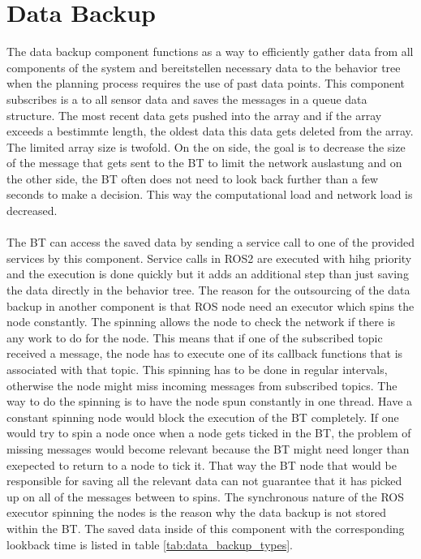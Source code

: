 \section{Data Backup}
The data backup component functions as a way to efficiently gather data from all components of the system and bereitstellen necessary data to the behavior tree when the planning process requires the use of past data points.  This component subscribes is a to all sensor data and saves the messages in a queue data structure. The most recent data gets pushed into the array and if the array exceeds a bestimmte length, the oldest data this data gets deleted from the array. The limited array size is twofold. On the on side, the goal is to decrease the size of the message that gets sent to the BT to limit the network auslastung and on the other side, the BT often does not need to look back further than a few seconds to make a decision. This way the computational load and network load is decreased.
\paragraph*{}

The BT can access the saved data by sending a service call to one of the provided services by this component. Service calls in ROS2 are executed with hihg priority and the execution is done quickly but it adds an additional step than just saving the data directly in the behavior tree. The reason for the outsourcing of the data backup in another component is that ROS node need an executor which spins the node constantly. The spinning allows the node to check the network if there is any work to do for the node. This means that if one of the subscribed topic received a message, the node has to execute one of its callback functions that is associated with that topic. This spinning has to be done in regular intervals, otherwise the node might miss incoming messages from subscribed topics. The way to do the spinning is to have the node spun constantly in one thread. Have a constant spinning node would block the execution of the BT completely. If one would try to spin a node once when a node gets ticked in the BT, the problem of missing messages would become relevant because the BT might need longer than exepected to return to a node to tick it. That way the BT node that would be responsible for saving all the relevant data can not guarantee that it has picked up on all of the messages between to spins. The synchronous nature of the ROS executor spinning the nodes is the reason why the data backup is not stored within the BT. 
The saved data inside of this component with the corresponding lookback time is listed in table \ref{tab:data_backup_types}. 

